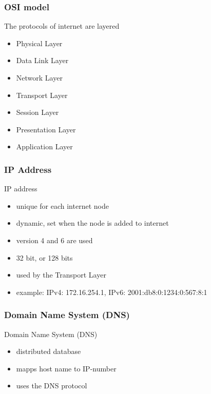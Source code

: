 \begin{frame}[fragile] \frametitle{OSI model}
The protocols of internet are layered
\begin{itemize}
  \item Physical Layer
  \item Data Link Layer
  \item Network Layer
  \item Transport Layer
  \item Session Layer
  \item Presentation Layer
  \item Application Layer
\end{itemize}
\end{frame}

\begin{frame}[fragile]\frametitle{IP Address}
IP address
\begin{itemize}
  \item unique for each internet node
  \item dynamic, set when the node is added to internet
  \item version 4 and 6 are used
  \item 32 bit, or 128 bits
  \item used by the Transport Layer
  \item example: IPv4: 172.16.254.1, IPv6: 2001:db8:0:1234:0:567:8:1
\end{itemize}
\end{frame}

\begin{frame}[fragile]\frametitle{Domain Name System (DNS)}
Domain Name System (DNS)
\begin{itemize}
  \item distributed database
  \item mapps host name to IP-number
  \item uses the DNS protocol
\end{itemize}
\end{frame}

